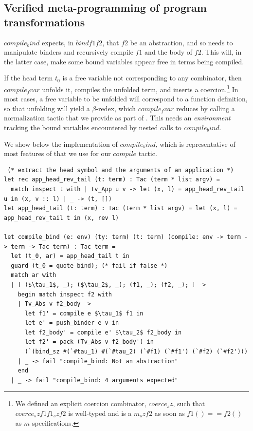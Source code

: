 \subsection{Verified meta-programming of program transformations}

\ls$compile_bind$ expects, in \ls$bind f1 f2$, that \ls$f2$ be an
abstraction, and so needs to manipulate binders and recursively
compile \ls$f1$ and the body of \ls$f2$. This will, in the latter
case, make some bound variables appear free in terms being compiled.

If the head term $t_0$ is a free variable not corresponding to any
combinator, then \ls$compile_fvar$ unfolds it, compiles the unfolded
term, and inserts a coercion.\footnote{We defined an explicit coercion
combinator, \ls$coerce_sz$, such that \ls$coerce_sz f1 f1_sz f2$ is
well-typed and is a \ls$m_sz f2$ as soon as \ls$f1 () == f2 ()$ as $m$
specifications.} In most cases, a free variable to be unfolded will
correspond to a function definition, so that unfolding will yield a
$\beta$-redex, which \ls$compile_fvar$ reduces by calling a
normalization tactic that we provide as part of \metafstar. This needs
an \emph{environment}
 tracking the bound variables encountered by nested calls
to \ls$compile_bind$.

We show below the implementation of \ls$compile_bind$, which is
representative of most features of \metafstar that we use for
our \ls$compile$ tactic.

\begin{lstlisting}
 (* extract the head symbol and the arguments of an application *)
let rec app_head_rev_tail (t: term) : Tac (term * list argv) = 
  match inspect t with | Tv_App u v -> let (x, l) = app_head_rev_tail u in (x, v :: l) | _ -> (t, [])
let app_head_tail (t: term) : Tac (term * list argv) = let (x, l) = app_head_rev_tail t in (x, rev l)

let compile_bind (e: env) (ty: term) (t: term) (compile: env -> term -> term -> Tac term) : Tac term =
  let (t_0, ar) = app_head_tail t in
  guard (t_0 = quote bind); (* fail if false *)
  match ar with
  | [ ($\tau_1$, _); ($\tau_2$, _); (f1, _); (f2, _); ] ->
    begin match inspect f2 with
    | Tv_Abs v f2_body ->
      let f1' = compile e $\tau_1$ f1 in
      let e' = push_binder e v in
      let f2_body' = compile e' $\tau_2$ f2_body in
      let f2' = pack (Tv_Abs v f2_body') in
      (`(bind_sz #(`#tau_1) #(`#tau_2) (`#f1) (`#f1') (`#f2) (`#f2')))
    | _ -> fail "compile_bind: Not an abstraction"
    end
  | _ -> fail "compile_bind: 4 arguments expected"
\end{lstlisting}

